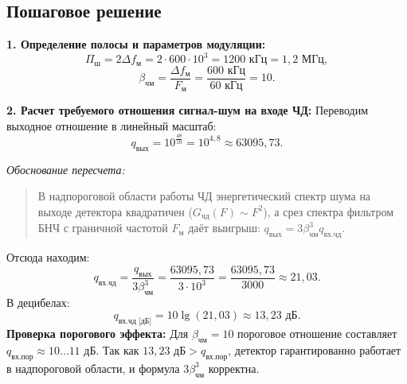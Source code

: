 \documentclass[12pt,a4paper]{article}
\begin{document}
\subsection{Пошаговое решение}

\textbf{1. Определение полосы и параметров модуляции:}
\begin{equation}
\Pi_{\text{ш}} = 2 \Delta f_{\text{м}} = 2 \cdot 600 \cdot 10^3 = 1200\text{ кГц} = 1{,}2\text{ МГц},
\end{equation}
\begin{equation}
\beta_{\text{чм}} = \frac{\Delta f_{\text{м}}}{F_{\text{м}}} = \frac{600\text{ кГц}}{60\text{ кГц}} = 10.
\end{equation}

\textbf{2. Расчет требуемого отношения сигнал-шум на входе ЧД:}
Переводим выходное отношение в линейный масштаб:
\begin{equation}
q_{\text{вых}} = 10^{\frac{48}{10}} = 10^{4{,}8} \approx 63095{,}73.
\end{equation}

\textit{Обоснование пересчета:}
\begin{quote}
В надпороговой области работы ЧД энергетический спектр шума на выходе детектора квадратичен ($G_{\text{чд}}(F) \sim F^2$), а срез спектра фильтром БНЧ с граничной частотой $F_{\text{м}}$ даёт выигрыш: $q_{\text{вых}} = 3 \beta_{\text{чм}}^3 q_{\text{вх.чд}}$.
\end{quote}
Отсюда находим:
\begin{equation}
q_{\text{вх.чд}} = \frac{q_{\text{вых}}}{3 \beta_{\text{чм}}^3} = \frac{63095{,}73}{3 \cdot 10^3} = \frac{63095{,}73}{3000} \approx 21{,}03.
\end{equation}
В децибелах:
\begin{equation}
q_{\text{вх.чд [дБ]}} = 10 \lg(21{,}03) \approx 13{,}23\text{ дБ}.
\end{equation}
\textbf{Проверка порогового эффекта:} Для $\beta_{\text{чм}} = 10$ пороговое отношение составляет $q_{\text{вх.пор}} \approx 10\dots11\text{ дБ}$. Так как $13{,}23\text{ дБ} > q_{\text{вх.пор}}$, детектор гарантированно работает в надпороговой области, и формула $3 \beta_{\text{чм}}^3$ корректна.
\end{document}
